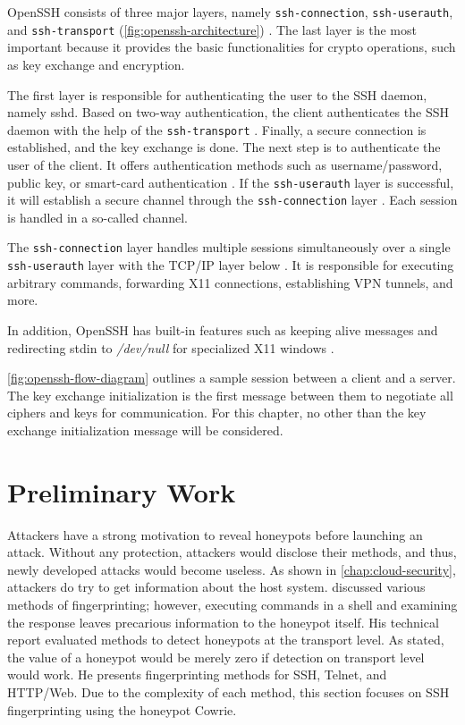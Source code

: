 OpenSSH consists of three major layers, namely \verb|ssh-connection|, \verb|ssh-userauth|, and \verb|ssh-transport| (\autoref{fig:openssh-architecture}) \cite{openssh2007}.
The last layer is the most important because it provides the basic functionalities for crypto operations, such as key exchange and encryption.

The first layer is responsible for authenticating the user to the SSH daemon, namely sshd.
Based on two-way authentication, the client authenticates the SSH daemon with the help of the \verb|ssh-transport| \cite{openssh2007}.
Finally, a secure connection is established, and the key exchange is done.
The next step is to authenticate the user of the client.
It offers authentication methods such as username/password, public key, or smart-card authentication \cite{openssh2007}.
If the \verb|ssh-userauth| layer is successful, it will establish a secure channel through the \verb|ssh-connection| layer \cite{openssh2007}.
Each session is handled in a so-called channel.

The \verb|ssh-connection| layer handles multiple sessions simultaneously over a single \verb|ssh-userauth| layer with the TCP/IP layer below \cite{openssh2007}.
It is responsible for executing arbitrary commands, forwarding X11 connections, establishing VPN tunnels, and more.

In addition, OpenSSH has built-in features such as keeping alive messages and redirecting stdin to \textit{/dev/null} for specialized X11 windows \cite{openssh2007}.

\autoref{fig:openssh-flow-diagram} outlines a sample session between a client and a server.
The key exchange initialization is the first message between them to negotiate all ciphers and keys for communication.
For this chapter, no other than the key exchange initialization message will be considered.

\section{Preliminary Work}

Attackers have a strong motivation to reveal honeypots before launching an attack.
Without any protection, attackers would disclose their methods, and thus, newly developed attacks would become useless.
As shown in \autoref{chap:cloud-security}, attackers do try to get information about the host system.
\citet{vetterl2020} discussed various methods of fingerprinting; however, executing commands in a shell and examining the response leaves precarious information to the honeypot itself.
His technical report evaluated methods to detect honeypots at the transport level.
As stated, the value of a honeypot would be merely zero if detection on transport level would work.
He presents fingerprinting methods for SSH, Telnet, and HTTP/Web.
Due to the complexity of each method, this section focuses on SSH fingerprinting using the honeypot Cowrie.

